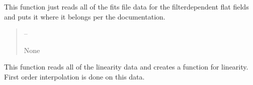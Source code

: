 \documentclass[letterpaper,11pt,english]{sphinxmanual}
\begin{document}
\begin{savenotes}
\begin{fulllineitems}
\begin{savenotes}
\begin{fulllineitems}
\begin{quote}
\begin{description}
\end{description}\end{quote}

\end{fulllineitems}\end{savenotes}


\begin{savenotes}\begin{fulllineitems}
\label{\detokenize{code/opihiexarata.opihi.preprocess:opihiexarata.opihi.preprocess.OpihiPreprocessSolution.__init_read_flat_data}}
\pysigstartsignatures
{}
\pysigstopsignatures
\sphinxAtStartPar
This function just reads all of the fits file data for the
filter\sphinxhyphen{}dependent flat fields and puts it where it belongs per the
documentation.
\begin{quote}\begin{description}
\sphinxAtStartPar
{} – 

\sphinxAtStartPar
None

\end{description}\end{quote}

\end{fulllineitems}\end{savenotes}


\begin{savenotes}\begin{fulllineitems}
\label{\detokenize{code/opihiexarata.opihi.preprocess:opihiexarata.opihi.preprocess.OpihiPreprocessSolution.__init_read_linearity_data}}
\pysigstartsignatures
{}
\pysigstopsignatures
\sphinxAtStartPar
This function reads all of the linearity data and creates a
function for linearity. First order interpolation is done on this data.


\end{fulllineitems}
\end{savenotes}
\end{fulllineitems}
\end{savenotes}
\end{document}
